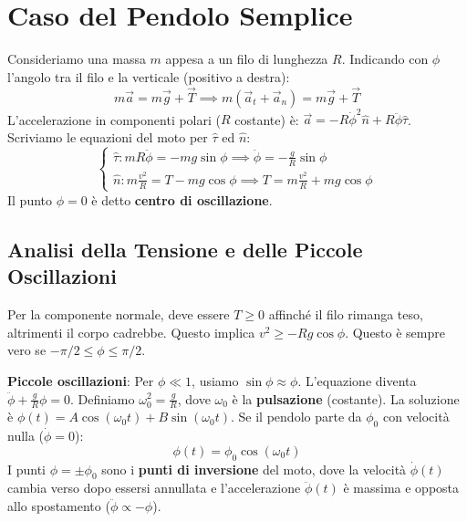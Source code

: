 \section{Caso del Pendolo Semplice}
Consideriamo una massa $m$ appesa a un filo di lunghezza $R$. Indicando con $\phi$ l'angolo tra il filo e la verticale (positivo a destra):
\begin{equation}
    m\vec{a} = m\vec{g} + \vec{T} \implies m(\vec{a}_t + \vec{a}_n) = m\vec{g} + \vec{T}
\end{equation}
L'accelerazione in componenti polari ($R$ costante) è:
$\vec{a} = -R\dot{\phi}^2 \hat{n} + R\ddot{\phi} \hat{\tau}$. 
Scriviamo le equazioni del moto per $\hat{\tau}$ ed $\hat{n}$:
\begin{equation}
    \begin{cases}
        \hat{\tau}: m R \ddot{\phi} = -mg \sin\phi \implies \ddot{\phi} = -\frac{g}{R} \sin\phi \\
        \hat{n}: m \frac{v^2}{R} = T - mg \cos\phi \implies T = m \frac{v^2}{R} + mg \cos\phi
    \end{cases}
\end{equation}
Il punto $\phi = 0$ è detto \textbf{centro di oscillazione}.

\subsection{Analisi della Tensione e delle Piccole Oscillazioni}
Per la componente normale, deve essere $T \geq 0$ affinché il filo rimanga teso, altrimenti il corpo cadrebbe. Questo implica $v^2 \geq -R g \cos\phi$. Questo è sempre vero se $-\pi/2 \leq \phi \leq \pi/2$.

\textbf{Piccole oscillazioni}: Per $\phi \ll 1$, usiamo $\sin\phi \approx \phi$. L'equazione diventa $\ddot{\phi} + \frac{g}{R} \phi = 0$.
Definiamo $\omega_0^2 = \frac{g}{R}$, dove $\omega_0$ è la \textbf{pulsazione} (costante).
La soluzione è $\phi(t) = A \cos(\omega_0 t) + B \sin(\omega_0 t)$.
Se il pendolo parte da $\phi_0$ con velocità nulla ($\dot{\phi}=0$):
\begin{equation}
    \phi(t) = \phi_0 \cos(\omega_0 t)
\end{equation}
I punti $\phi = \pm \phi_0$ sono i \textbf{punti di inversione} del moto, dove la velocità $\dot{\phi}(t)$ cambia verso dopo essersi annullata e l'accelerazione $\ddot{\phi}(t)$ è massima e opposta allo spostamento ($\ddot{\phi} \propto -\phi$).

